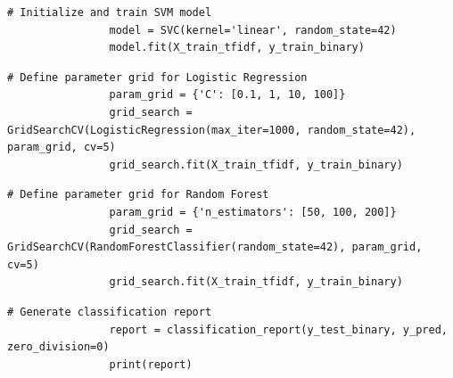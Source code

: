             \vspace{0.5em}
            
            \begin{lstlisting}[caption={Train SVM model}, label={lst:svm}]
                # Initialize and train SVM model
                model = SVC(kernel='linear', random_state=42)
                model.fit(X_train_tfidf, y_train_binary)
            \end{lstlisting}
            
            \vspace{0.5em}
            
            \begin{lstlisting}[caption={Parameter grid for Logistic Regression}, label={lst:param_grid_logistic}]
                # Define parameter grid for Logistic Regression
                param_grid = {'C': [0.1, 1, 10, 100]}
                grid_search = GridSearchCV(LogisticRegression(max_iter=1000, random_state=42), param_grid, cv=5)
                grid_search.fit(X_train_tfidf, y_train_binary)
            \end{lstlisting}
            
            \vspace{0.5em}
            
            \begin{lstlisting}[caption={Parameter grid for Random Forest}, label={lst:param_grid_rf}]
                # Define parameter grid for Random Forest
                param_grid = {'n_estimators': [50, 100, 200]}
                grid_search = GridSearchCV(RandomForestClassifier(random_state=42), param_grid, cv=5)
                grid_search.fit(X_train_tfidf, y_train_binary)
            \end{lstlisting}
            
            \vspace{0.5em}
            
            \begin{lstlisting}[caption={Generate classification report}, label={lst:classification_report}]
                # Generate classification report
                report = classification_report(y_test_binary, y_pred, zero_division=0)
                print(report)
            \end{lstlisting}
            

